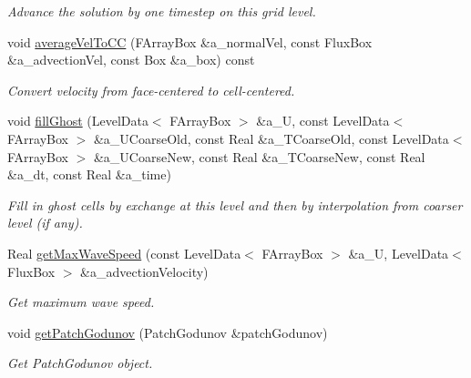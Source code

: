 \begin{DoxyCompactItemize}
\begin{DoxyCompactList}\small\item\em Advance the solution by one timestep on this grid level. \end{DoxyCompactList}\item 
void \hyperlink{class_level_advect_ab4af138371be3b5d2c4624b761e74941}{average\-Vel\-To\-C\-C} (F\-Array\-Box \&a\-\_\-normal\-Vel, const Flux\-Box \&a\-\_\-advection\-Vel, const Box \&a\-\_\-box) const 
\begin{DoxyCompactList}\small\item\em Convert velocity from face-\/centered to cell-\/centered. \end{DoxyCompactList}\item 
void \hyperlink{class_level_advect_a6e0534084ef26a19f41fbafe4bcba15e}{fill\-Ghost} (Level\-Data$<$ F\-Array\-Box $>$ \&a\-\_\-\-U, const Level\-Data$<$ F\-Array\-Box $>$ \&a\-\_\-\-U\-Coarse\-Old, const Real \&a\-\_\-\-T\-Coarse\-Old, const Level\-Data$<$ F\-Array\-Box $>$ \&a\-\_\-\-U\-Coarse\-New, const Real \&a\-\_\-\-T\-Coarse\-New, const Real \&a\-\_\-dt, const Real \&a\-\_\-time)
\begin{DoxyCompactList}\small\item\em Fill in ghost cells by exchange at this level and then by interpolation from coarser level (if any). \end{DoxyCompactList}\item 
Real \hyperlink{class_level_advect_a81626f8255195ae94d01248c3c90e6d5}{get\-Max\-Wave\-Speed} (const Level\-Data$<$ F\-Array\-Box $>$ \&a\-\_\-\-U, Level\-Data$<$ Flux\-Box $>$ \&a\-\_\-advection\-Velocity)
\begin{DoxyCompactList}\small\item\em Get maximum wave speed. \end{DoxyCompactList}\item 
\hypertarget{class_level_advect_a2dec4b6dd1075da650a811c8d0a32fe9}{void \hyperlink{class_level_advect_a2dec4b6dd1075da650a811c8d0a32fe9}{get\-Patch\-Godunov} (Patch\-Godunov \&patch\-Godunov)}\label{class_level_advect_a2dec4b6dd1075da650a811c8d0a32fe9}

\begin{DoxyCompactList}\small\item\em Get Patch\-Godunov object. \end{DoxyCompactList}\end{DoxyCompactItemize}
